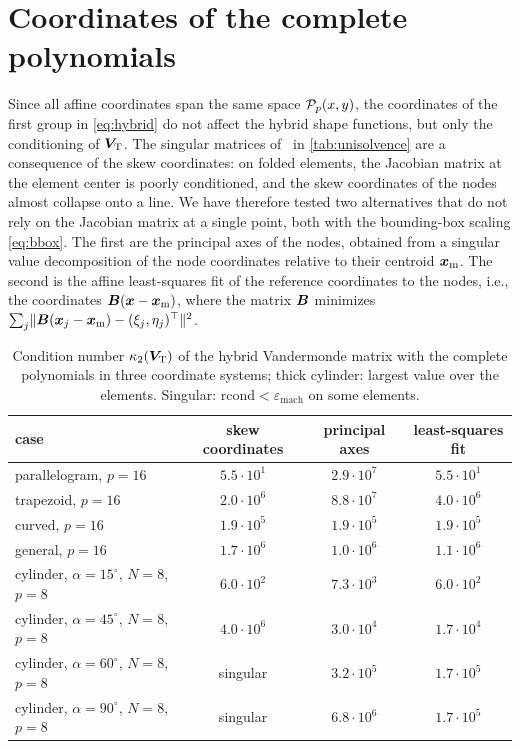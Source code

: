 \section{Coordinates of the complete polynomials}
\label{app:frames}
%
Since all affine coordinates span the same space $\mathcal P_p(x,y)$, the coordinates of the first group in \cref{eq:hybrid} do not affect the hybrid shape functions, but only the conditioning of $\bm{V}_{\mathrm{T}}$. The singular matrices of \PH\ in \cref{tab:unisolvence} are a consequence of the skew coordinates: on folded elements, the Jacobian matrix at the element center is poorly conditioned, and the skew coordinates of the nodes almost collapse onto a line. We have therefore tested two alternatives that do not rely on the Jacobian matrix at a single point, both with the bounding-box scaling \cref{eq:bbox}. The first are the principal axes of the nodes, obtained from a singular value decomposition of the node coordinates relative to their centroid $\bm{x}_{\mathrm{m}}$. The second is the affine least-squares fit of the reference coordinates to the nodes, i.e., the coordinates $\bm{B}(\bm{x}-\bm{x}_{\mathrm{m}})$, where the matrix $\bm{B}$ minimizes $\sum_j\lVert\bm{B}(\bm{x}_j-\bm{x}_{\mathrm{m}})-(\xi_j,\eta_j)^\top\rVert^2$.

\begin{table}[htbp]
  \centering\small
  \caption{Condition number $\kappa_2(\bm{V}_{\mathrm{T}})$ of the hybrid Vandermonde matrix with the complete polynomials in three coordinate systems; thick cylinder: largest value over the elements. Singular: $\mathrm{rcond}<\varepsilon_{\mathrm{mach}}$ on some elements.}
  \label{tab:frames}
  \begin{tabular}{@{}lccc@{}}
    \toprule
    case & skew coordinates & principal axes & least-squares fit \\
    \midrule
    parallelogram, $p=16$ & $5.5\cdot10^{1}$ & $2.9\cdot10^{7}$ & $5.5\cdot10^{1}$ \\
    trapezoid, $p=16$ & $2.0\cdot10^{6}$ & $8.8\cdot10^{7}$ & $4.0\cdot10^{6}$ \\
    curved, $p=16$ & $1.9\cdot10^{5}$ & $1.9\cdot10^{5}$ & $1.9\cdot10^{5}$ \\
    general, $p=16$ & $1.7\cdot10^{6}$ & $1.0\cdot10^{6}$ & $1.1\cdot10^{6}$ \\
    cylinder, $\alpha=15^\circ$, $N=8$, $p=8$ & $6.0\cdot10^{2}$ & $7.3\cdot10^{3}$ & $6.0\cdot10^{2}$ \\
    cylinder, $\alpha=45^\circ$, $N=8$, $p=8$ & $4.0\cdot10^{6}$ & $3.0\cdot10^{4}$ & $1.7\cdot10^{4}$ \\
    cylinder, $\alpha=60^\circ$, $N=8$, $p=8$ & singular & $3.2\cdot10^{5}$ & $1.7\cdot10^{5}$ \\
    cylinder, $\alpha=90^\circ$, $N=8$, $p=8$ & singular & $6.8\cdot10^{6}$ & $1.7\cdot10^{5}$ \\
    \bottomrule
  \end{tabular}
\end{table}

